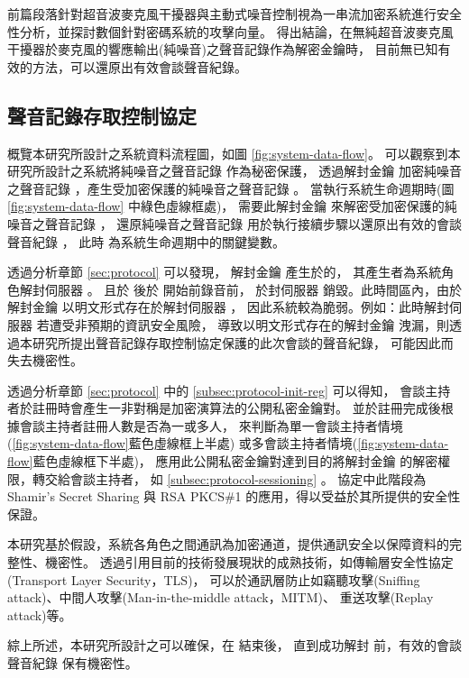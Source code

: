     前篇段落針對超音波麥克風干擾器與主動式噪音控制視為一串流加密系統進行安全性分析，並探討數個針對密碼系統的攻擊向量。
得出結論，在無純超音波麥克風干擾器於麥克風的響應輸出(純噪音)之聲音記錄作為解密金鑰時，
目前無已知有效的方法，可以還原出有效會談聲音紀錄。


\subsection{聲音記錄存取控制協定}

    概覽本研究所設計之系統資料流程圖，如圖 \ref{fig:system-data-flow}。
可以觀察到本研究所設計之系統將純噪音之聲音記錄 \DEFrecN 作為秘密保護，
透過解封金鑰 \DEFunsealKey 加密純噪音之聲音記錄 \DEFrecN，產生受加密保護的純噪音之聲音記錄 \DEFrecP。
當執行系統生命週期時(圖 \ref{fig:system-data-flow} 中綠色虛線框處)，
需要此解封金鑰 \DEFunsealKey 來解密受加密保護的純噪音之聲音記錄 \DEFrecP，
還原純噪音之聲音記錄 \DEFrecN 用於執行接續步驟以還原出有效的會談聲音紀錄 \DEFrecREV，
此時 \DEFunsealKey 為系統生命週期中的關鍵變數。

    透過分析章節 \ref{sec:protocol} 可以發現，
解封金鑰 \DEFunsealKey 產生於的，
其產生者為系統角色解封伺服器 \DEFserver。
且於  後於  開始前錄音前，
於封伺服器 \DEFserver 銷毀。此時間區內，由於解封金鑰 \DEFunsealKey 以明文形式存在於解封伺服器 \DEFserver，
因此系統較為脆弱。例如：此時解封伺服器 \DEFserver 若遭受非預期的資訊安全風險，
導致以明文形式存在的解封金鑰 \DEFunsealKey 洩漏，則透過本研究所提出聲音記錄存取控制協定保護的此次會談的聲音紀錄，
可能因此而失去機密性。

    透過分析章節 \ref{sec:protocol} 
中的 \ref{subsec:protocol-init-reg} 可以得知，
會談主持者於註冊時會產生一非對稱是加密演算法的公開私密金鑰對。
並於註冊完成後根據會談主持者註冊人數是否為一或多人，
來判斷為單一會談主持者情境(\ref{fig:system-data-flow}藍色虛線框上半處)
或多會談主持者情境(\ref{fig:system-data-flow}藍色虛線框下半處)，
應用此公開私密金鑰對達到目的將解封金鑰 \DEFunsealKey 的解密權限，轉交給會談主持者，
如 \ref{subsec:protocol-sessioning} 。
協定中此階段為 Shamir's Secret Sharing \cite{shamir1979share} 與
RSA PKCS\#1 \cite{rfc8017} 的應用，得以受益於其所提供的安全性保證。

    本研究基於假設，系統各角色之間通訊為加密通道，提供通訊安全以保障資料的完整性、機密性。
透過引用目前的技術發展現狀的成熟技術，如傳輸層安全性協定(Transport Layer Security，TLS)，
可以於通訊層防止如竊聽攻擊(Sniffing attack)、中間人攻擊(Man-in-the-middle attack，MITM)、
重送攻擊(Replay attack)等\cite{rfc5246}\cite{rfc8446}。

    綜上所述，本研究所設計之可以確保，在  結束後，
直到成功解封  前，有效的會談聲音紀錄 \DEFrecREV 保有機密性。